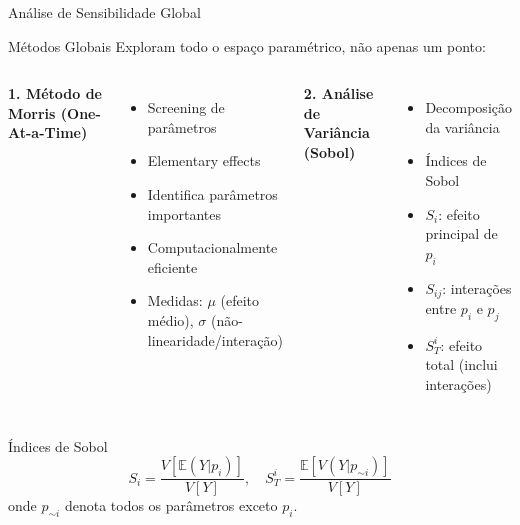 \begin{frame}[allowframebreaks]{Análise de Sensibilidade Global}
\begin{block}{Métodos Globais}
Exploram todo o espaço paramétrico, não apenas um ponto:
\end{block}

\vspace{0.3cm}

\begin{columns}
\textbf{1. Método de Morris (One-At-a-Time)}
\begin{itemize}
    \item Screening de parâmetros
    \item Elementary effects
    \item Identifica parâmetros importantes
    \item Computacionalmente eficiente
    \item Medidas: $\mu$ (efeito médio), $\sigma$ (não-linearidade/interação)
\end{itemize}

\textbf{2. Análise de Variância (Sobol)}
\begin{itemize}
    \item Decomposição da variância
    \item Índices de Sobol
    \item $S_i$: efeito principal de $p_i$
    \item $S_{ij}$: interações entre $p_i$ e $p_j$
    \item $S_T^i$: efeito total (inclui interações)
\end{itemize}
\end{columns}

\vspace{0.3cm}

\begin{block}{Índices de Sobol}
\begin{equation*}
S_i = \frac{V[\mathbb{E}(Y|p_i)]}{V[Y]}, \quad S_T^i = \frac{\mathbb{E}[V(Y|p_{\sim i})]}{V[Y]}
\end{equation*}
onde $p_{\sim i}$ denota todos os parâmetros exceto $p_i$.
\end{block}
\end{frame}

